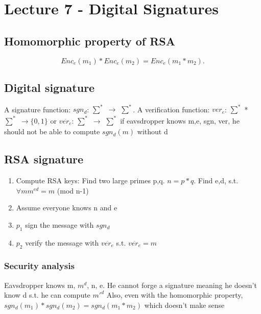 \documentclass[../main.tex]{subfile}
\begin{document}
 \section{Lecture 7 - Digital Signatures}
 \subsection{Homomorphic property of RSA}
 \[
 Enc_{e}(m_{1}) * Enc_{e}(m_{2}) =  Enc_{e}(m_{1} * m_{2})
 .\] 
 \subsection{Digital signature}
 A signature function: $sgn_{d}$: $\sum_{}^{*}$ $\to $ $\sum_{}^{*}$.
 A verification function: $ver_{e}$: $\sum_{}^{*}$ *  $\sum_{}^{*}$ $\to \{0,1\}$  or  $\overline{ver_{e}}$: $\sum_{}^{*}$ $\to$ $\sum_{}^{*}$
 if eavsdropper knows m,e, sgn, ver, he should not be able to compute $sgn_{d}(m)$ without d
 \subsection{RSA signature}
 \begin{enumerate}
 	\item Compute RSA keys: Find two large primes p,q. $n = p * q$. Find e,d, s.t. $\forall m m^{ed} = m$ (mod n-1)
	\item Assume everyone knows n and e
	\item $p_{1}$ sign the message with $sgn_{d}$ 
	\item $p_{2}$ verify the message with $\overline{ver_{e}}$ s.t.	$\overline{ver_{e}} = m$
 \end{enumerate}
 \subsubsection{Security analysis}
 Eavsdropper knows m, $m^{d}$, n, e. He cannot forge a signature meaning he doesn't know d s.t. he can compute $m'^{d}$
 Also, even with the homomorphic property, $sgn_{d}(m_{1}) * sgn_{d}(m_{2}) =  sgn_{d}(m_{1} * m_{2})$ which doesn't make sense
\end{document}
